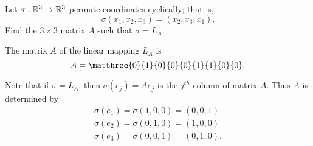 \documentclass{article}
\begin{document}
\begin{exercise} \label{c4.3.10}
Let $\sigma:\mathbb R^3\to\mathbb R^3$ permute coordinates cyclically; that is,
\[
\sigma(x_1,x_2,x_3) = (x_2,x_3,x_1).
\]
Find the $3\times 3$ matrix $A$ such that $\sigma = L_A$.

\begin{solution}

\ans The matrix $A$ of the linear mapping $L_A$ is
\[ 
A = \matthree{0}{1}{0}{0}{0}{1}{1}{0}{0}. 
\]

\soln Note that if $\sigma = L_A$, then $\sigma(e_j) = Ae_j$ is the
$j^{th}$ column of matrix $A$.  Thus $A$ is determined by
\[
\begin{array}{l}
\sigma(e_1) = \sigma(1,0,0) = (0,0,1) \\
\sigma(e_2) = \sigma(0,1,0) = (1,0,0) \\
\sigma(e_3) = \sigma(0,0,1) = (0,1,0). \end{array}
\]


\end{solution}
\end{exercise}





\problemlabel
\end{document}
